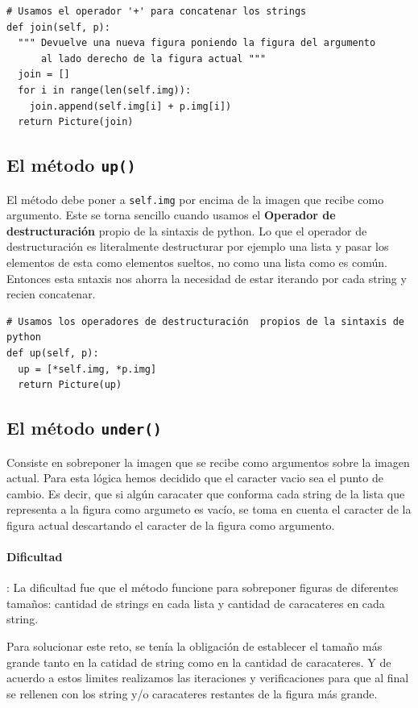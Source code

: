 \documentclass[10pt, a4paper]{article}
\newcommand{\mintpython}[1]{\texttt{#1}}
\begin{document}
\begin{verbatim}
# Usamos el operador '+' para concatenar los strings
def join(self, p):
  """ Devuelve una nueva figura poniendo la figura del argumento 
      al lado derecho de la figura actual """
  join = []
  for i in range(len(self.img)):
    join.append(self.img[i] + p.img[i])
  return Picture(join)
\end{verbatim}

\subsection{El método \mintpython{up()}}
El método debe poner a \mintpython{self.img} por encima de la imagen que recibe como argumento. Este se torna sencillo cuando usamos el \textbf{Operador de destructuración} propio de la sintaxis de python. 
\singlespacing
Lo que el operador de destructuración es literalmente destructurar por ejemplo una lista y pasar los elementos de esta como elementos sueltos, no como una lista como es común. Entonces esta sntaxis nos ahorra la necesidad de estar iterando por cada string y recien concatenar.

\begin{verbatim}
# Usamos los operadores de destructuración  propios de la sintaxis de python
def up(self, p):
  up = [*self.img, *p.img]
  return Picture(up)
\end{verbatim}

\subsection{El método \mintpython{under()}}
Consiste en sobreponer la imagen que se recibe como argumentos sobre la imagen actual. Para esta lógica hemos decidido que el caracter vacio sea el punto de cambio. Es decir, que si algún caracater que conforma cada string de la lista que representa a la figura como argumeto es vacío, se toma en cuenta el caracter de la figura actual descartando el caracter de la figura como argumento.

\paragraph{Dificultad}: La dificultad fue que el método funcione para sobreponer figuras de diferentes tamaños: cantidad de strings en cada lista y cantidad de caracateres en cada string.

\singlespacing
Para solucionar este reto, se tenía la obligación de establecer el tamaño más grande tanto en la catidad de string como en la cantidad de caracateres. Y de acuerdo a estos limites realizamos las iteraciones y verificaciones para que al final se rellenen con los string y/o caracateres restantes de la figura más grande.
\end{document}
